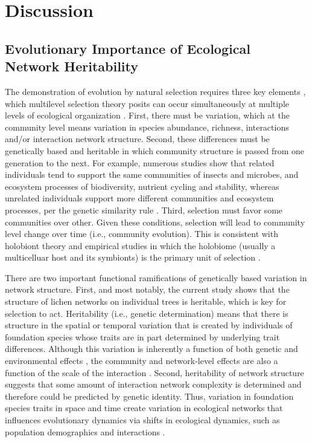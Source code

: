 \documentclass[fleqn,12pt]{olplainarticle}
\begin{document}
\section*{Discussion}


\subsection*{Evolutionary Importance of Ecological Network Heritability}

The demonstration of evolution by natural selection requires three key
elements \citep{Conner2004ATextbook}, which multilevel selection
theory posits can occur simultaneously at multiple levels of
ecological organization \citep{Whitham2003,
  Whitham2020IntraspecificEvolution}. First, there must be variation,
which at the community level means variation in species abundance,
richness, interactions and/or interaction network structure. Second,
these differences must be genetically based and heritable in which
community structure is passed from one generation to the next. For
example, numerous studies show that related individuals tend to
support the same communities of insects and microbes, and ecosystem
processes of biodiversity, nutrient cycling and stability, whereas
unrelated individuals support more different communities and ecosystem
processes, per the genetic similarity rule \citep{Bangert2006,
  Bangert2008a, Barbour2009c,
  Whitham2020IntraspecificEvolution}. Third, selection must favor some
communities over other. Given these conditions, selection will lead to
community level change over time (i.e., community evolution). This is
consistent with holobiont theory and empirical studies
\citep{Zilber-Rosenberg2008, Gilbert2012} in which the holobiome
(usually a multicelluar host and its symbionts) is the primary unit of
selection \citep{Bordenstein2015, Johnson2021}.

There are two important functional ramifications of genetically based
variation in network structure. First, and most notably, the current
study shows that the structure of lichen networks on individual trees
is heritable, which is key for selection to act. Heritability (i.e.,
genetic determination) means that there is structure in the spatial or
temporal variation that is created by individuals of foundation
species whose traits are in part determined by underlying trait
differences. Although this variation is inherently a function of both
genetic and environmental effects \citep{Conner2004ATextbook}, the
community and network-level effects are also a function of the scale
of the interaction \citep{Shuster2006COMMUNITYSTRUCTURE-fix,
  Lau2017a}. Second, heritability of network structure suggests that
some amount of interaction network complexity is determined and
therefore could be predicted by genetic identity. Thus, variation in
foundation species traits in space and time create variation in
ecological networks that influences evolutionary dynamics via shifts
in ecological dynamics, such as population demographics and
interactions \citep{Guimaraes2020afix}.
\end{document}

